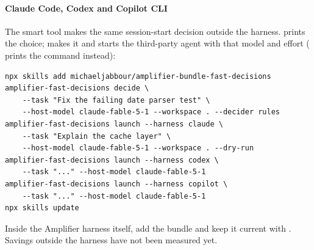 \paragraph{Claude Code, Codex and Copilot CLI} The smart tool makes the same session-start decision outside the
harness.  prints the choice;  makes it and starts the third-party agent with that model and
effort ( prints the command instead):
\begin{lstlisting}[basicstyle=\ttfamily\footnotesize, frame=single, rulecolor=\color{okgray}]
npx skills add michaeljabbour/amplifier-bundle-fast-decisions
amplifier-fast-decisions decide \
    --task "Fix the failing date parser test" \
    --host-model claude-fable-5-1 --workspace . --decider rules
amplifier-fast-decisions launch --harness claude \
    --task "Explain the cache layer" \
    --host-model claude-fable-5-1 --workspace . --dry-run
amplifier-fast-decisions launch --harness codex \
    --task "..." --host-model claude-fable-5-1
amplifier-fast-decisions launch --harness copilot \
    --task "..." --host-model claude-fable-5-1
npx skills update
\end{lstlisting}
Inside the Amplifier harness itself, add the bundle and keep it current with . Savings
outside the harness have not been measured yet.
